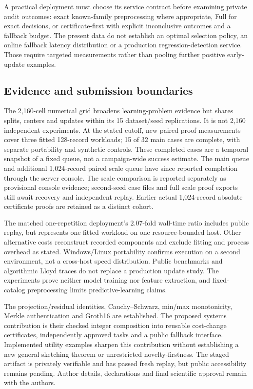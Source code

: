 A practical deployment must choose its service contract before examining
private audit outcomes: exact known-family preprocessing where appropriate,
Full for exact decisions, or certificate-first with explicit inconclusive
outcomes and a fallback budget. The present data do not establish an optimal
selection policy, an online fallback latency distribution or a production
regression-detection service. Those require targeted measurements rather than
pooling further positive early-update examples.

\subsection{Evidence and submission boundaries}
The 2,160-cell numerical grid broadens learning-problem evidence but shares
splits, centers and updates within its 15 dataset/seed replications. It is
not 2,160 independent experiments. At the stated cutoff, new paired proof
measurements cover three fitted 128-record workloads; 15 of 32 main cases are
complete, with separate portability and synthetic controls. These completed
cases are a temporal snapshot of a fixed queue, not a campaign-wide success
estimate. The main queue and additional 1,024-record paired scale queue have since
reported completion through the server console. The scale comparison is
reported separately as provisional console evidence; second-seed case files
and full scale proof exports still await recovery and independent replay. Earlier actual 1,024-record absolute
certificate proofs are retained as a distinct cohort.

The matched one-repetition deployment's 2.07-fold wall-time ratio includes
public replay, but represents one fitted workload on one resource-bounded
host. Other alternative costs reconstruct recorded components and exclude
fitting and process overhead as stated. Windows/Linux portability confirms
execution on a second environment, not a cross-host speed distribution.
Public benchmarks and algorithmic Lloyd traces do not replace a production
update study. The experiments prove neither model training nor feature
extraction, and fixed-catalog preprocessing limits predictive-learning claims.

The projection/residual identities, Cauchy--Schwarz, min/max monotonicity,
Merkle authentication and Groth16 are established. The proposed systems
contribution is their checked integer composition into reusable cost-change
certificates, independently approved tasks and a public fallback interface.
Implemented utility examples sharpen this contribution without establishing
a new general sketching theorem or unrestricted novelty-firstness.
The staged artifact is privately verifiable and has passed fresh replay, but
public accessibility remains pending. Author details, declarations and final
scientific approval remain with the authors.

